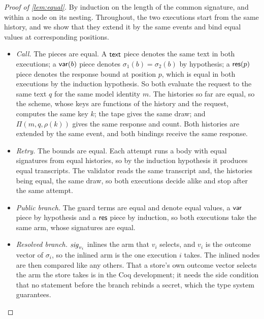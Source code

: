 \begin{proof}[Proof of \cref{lem:equal}]
By induction on the length of the common signature, and within a node on its nesting.
Throughout, the two executions start from the same history, and we show that they
extend it by the same events and bind equal values at corresponding positions.
\begin{itemize}[leftmargin=*]
\item \emph{Call.} The pieces are equal. A $\mathsf{text}$ piece denotes the same text in both
  executions; a $\mathsf{var}(b)$ piece denotes $\sigma_1(b) = \sigma_2(b)$ by hypothesis; a
  $\mathsf{res}(p)$ piece denotes the response bound at position $p$, which is equal in both
  executions by the induction hypothesis. So both evaluate the request to the same text
  $q$ for the same model identity $m$. The histories so far are equal, so the scheme,
  whose keys are functions of the history and the request, computes the same key $k$;
  the tape gives the same draw; and $\Pi(m, q, \rho(k))$ gives the same response and
  count. Both histories are extended by the same event, and both bindings receive the
  same response.
\item \emph{Retry.} The bounds are equal. Each attempt runs a body with equal signatures
  from equal histories, so by the induction hypothesis it produces equal transcripts.
  The validator reads the same transcript and, the histories being equal, the same draw,
  so both executions decide alike and stop after the same attempt.
\item \emph{Public branch.} The guard terms are equal and denote equal values, a $\mathsf{var}$
  piece by hypothesis and a $\mathsf{res}$ piece by induction, so both executions take the same
  arm, whose signatures are equal.
\item \emph{Resolved branch.} $\mathit{sig}_{v_i}$ inlines the arm that $v_i$ selects, and
  $v_i$ is the outcome vector of $\sigma_i$, so the inlined arm is the one execution $i$
  takes. The inlined nodes are then compared like any others. That a store's own outcome
  vector selects the arm the store takes is  in the Coq
  development; it needs the side condition that no statement before the branch
  rebinds a secret, which the type system guarantees.\qedhere
\end{itemize}
\end{proof}

